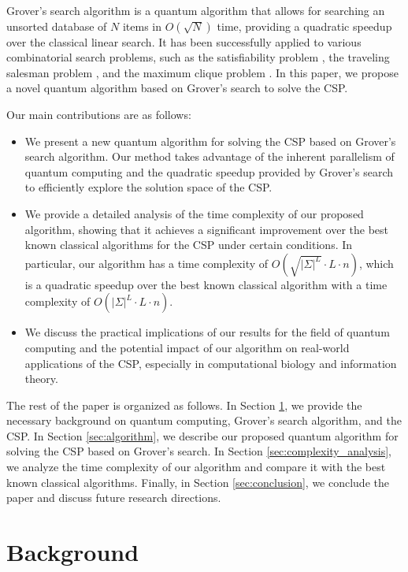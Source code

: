 Grover's search algorithm \cite{grover1996fast} is a quantum algorithm that allows for searching an unsorted database of $N$ items in $O(\sqrt{N})$ time, providing a quadratic speedup over the classical linear search. It has been successfully applied to various combinatorial search problems, such as the satisfiability problem \cite{cerf1998quantum}, the traveling salesman problem \cite{daskin2012solving}, and the maximum clique problem \cite{childs2002quantum}. In this paper, we propose a novel quantum algorithm based on Grover's search to solve the CSP.

Our main contributions are as follows:

\begin{itemize}
  \item We present a new quantum algorithm for solving the CSP based on Grover's search algorithm. Our method takes advantage of the inherent parallelism of quantum computing and the quadratic speedup provided by Grover's search to efficiently explore the solution space of the CSP.
  
  \item We provide a detailed analysis of the time complexity of our proposed algorithm, showing that it achieves a significant improvement over the best known classical algorithms for the CSP under certain conditions. In particular, our algorithm has a time complexity of $O(\sqrt{|\Sigma|^L} \cdot L \cdot n)$, which is a quadratic speedup over the best known classical algorithm with a time complexity of $O(|\Sigma|^L \cdot L \cdot n)$.
  
  \item We discuss the practical implications of our results for the field of quantum computing and the potential impact of our algorithm on real-world applications of the CSP, especially in computational biology and information theory.
\end{itemize}

The rest of the paper is organized as follows. In Section \ref{sec:background}, we provide the necessary background on quantum computing, Grover's search algorithm, and the CSP. In Section \ref{sec:algorithm}, we describe our proposed quantum algorithm for solving the CSP based on Grover's search. In Section \ref{sec:complexity_analysis}, we analyze the time complexity of our algorithm and compare it with the best known classical algorithms. Finally, in Section \ref{sec:conclusion}, we conclude the paper and discuss future research directions.

\section{Background}
\label{sec:background}

